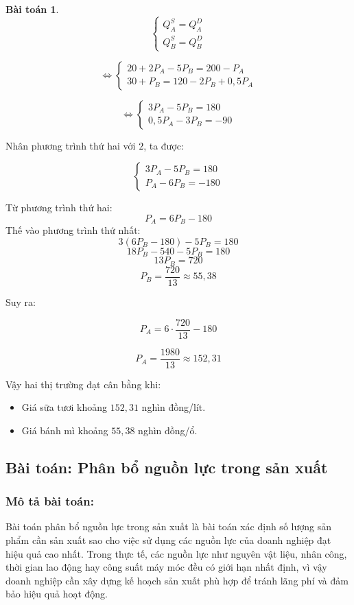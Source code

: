 \documentclass[12pt,a4paper,oneside]{book}
\theoremstyle{theorem}
\theoremstyle{definition}
\newtheorem{bt}[theorem2]{Bài toán}
\begin{document}
\begin{bt}
\[
\begin{cases}
Q_A^S=Q_A^D\\
Q_B^S=Q_B^D
\end{cases}
\]

\[
\Leftrightarrow
\begin{cases}
20+2P_A-5P_B=200-P_A\\
30+P_B=120-2P_B+0,5P_A
\end{cases}
\]

\[
\Leftrightarrow
\begin{cases}
3P_A-5P_B=180\\
0,5P_A-3P_B=-90
\end{cases}
\]

Nhân phương trình thứ hai với \(2\), ta được:

\[
\begin{cases}
3P_A-5P_B=180\\
P_A-6P_B=-180
\end{cases}
\]

Từ phương trình thứ hai:
\[P_A=6P_B-180
\]
Thế vào phương trình thứ nhất:
\[3(6P_B-180)-5P_B=180
\]
\[
18P_B-540-5P_B=180
\]
\[
13P_B=720
\]
\[
P_B=\frac{720}{13}\approx55,38
\]

Suy ra:

\[
P_A=6\cdot\frac{720}{13}-180
\]

\[
P_A=\frac{1980}{13}\approx152,31
\]

Vậy hai thị trường đạt cân bằng khi:

\begin{itemize}
    \item Giá sữa tươi khoảng \(152,31\) nghìn đồng/lít.
    
    \item Giá bánh mì khoảng \(55,38\) nghìn đồng/ổ.
\end{itemize}
\end{bt}


\subsection{Bài toán: Phân bổ nguồn lực trong sản xuất}
\subsubsection{Mô tả bài toán:} Bài toán phân bổ nguồn lực trong sản xuất là bài toán xác định số lượng sản
phẩm cần sản xuất sao cho việc sử dụng các nguồn lực của doanh nghiệp đạt
hiệu quả cao nhất. Trong thực tế, các nguồn lực như nguyên vật liệu, nhân công,
thời gian lao động hay công suất máy móc đều có giới hạn nhất định, vì vậy
doanh nghiệp cần xây dựng kế hoạch sản xuất phù hợp để tránh lãng phí và đảm
bảo hiệu quả hoạt động.
\end{document}
